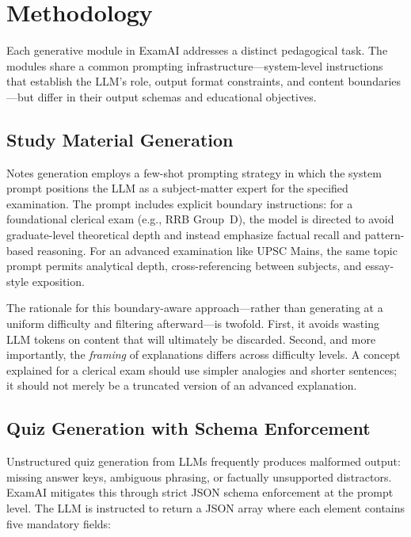 \documentclass[conference]{IEEEtran}
\begin{document}
\section{Methodology}
\label{sec:methodology}

Each generative module in ExamAI addresses a distinct pedagogical task. The modules share a common prompting infrastructure---system-level instructions that establish the LLM's role, output format constraints, and content boundaries---but differ in their output schemas and educational objectives.

\subsection{Study Material Generation}

Notes generation employs a few-shot prompting strategy in which the system prompt positions the LLM as a subject-matter expert for the specified examination. The prompt includes explicit boundary instructions: for a foundational clerical exam (e.g., RRB Group~D), the model is directed to avoid graduate-level theoretical depth and instead emphasize factual recall and pattern-based reasoning. For an advanced examination like UPSC Mains, the same topic prompt permits analytical depth, cross-referencing between subjects, and essay-style exposition.

The rationale for this boundary-aware approach---rather than generating at a uniform difficulty and filtering afterward---is twofold. First, it avoids wasting LLM tokens on content that will ultimately be discarded. Second, and more importantly, the \textit{framing} of explanations differs across difficulty levels. A concept explained for a clerical exam should use simpler analogies and shorter sentences; it should not merely be a truncated version of an advanced explanation.

\subsection{Quiz Generation with Schema Enforcement}

Unstructured quiz generation from LLMs frequently produces malformed output: missing answer keys, ambiguous phrasing, or factually unsupported distractors. ExamAI mitigates this through strict JSON schema enforcement at the prompt level. The LLM is instructed to return a JSON array where each element contains five mandatory fields:
\end{document}
